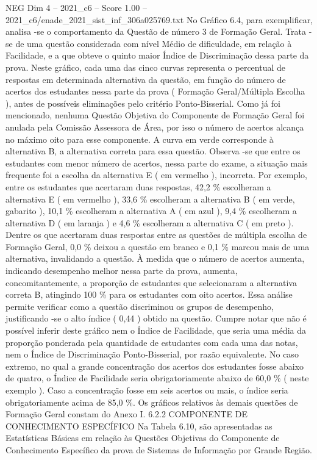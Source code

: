 \begin{textsample}{NEG Dim 4 – 2021\_c6 – Score 1.00 – 2021\_c6/enade\_2021\_sist\_inf\_306a025769.txt}
No Gráfico 6.4, para exemplificar, analisa -se o comportamento da Questão de número 3 de Formação Geral.
Trata -se de uma questão considerada com nível Médio de dificuldade, em relação à Facilidade, e a que obteve o quinto maior Índice de Discriminação dessa parte da prova.
Neste gráfico, cada uma das cinco curvas representa o percentual de respostas em determinada alternativa da questão, em função do número de acertos dos estudantes nessa parte da prova ( Formação Geral/Múltipla Escolha ), antes de possíveis eliminações pelo critério Ponto-Bisserial.
Como já foi mencionado, nenhuma Questão Objetiva do Componente de Formação Geral foi anulada pela Comissão Assessora de Área, por isso o número de acertos alcança no máximo oito para esse componente.
A curva em verde corresponde à alternativa B, a alternativa correta para essa questão.
Observa -se que entre os estudantes com menor número de acertos, nessa parte do exame, a situação mais frequente foi a escolha da alternativa E ( em vermelho ), incorreta.
Por exemplo, entre os estudantes que acertaram duas respostas, 42,2 \% escolheram a alternativa E ( em vermelho ), 33,6 \% escolheram a alternativa B ( em verde, gabarito ), 10,1 \% escolheram a alternativa A ( em azul ), 9,4 \% escolheram a alternativa D ( em laranja ) e 4,6 \% escolheram a alternativa C ( em preto ).
Dentre os que acertaram duas respostas entre as questões de múltipla escolha de Formação Geral, 0,0 \% deixou a questão em branco e 0,1 \% marcou mais de uma alternativa, invalidando a questão.
À medida que o número de acertos aumenta, indicando desempenho melhor nessa parte da prova, aumenta, concomitantemente, a proporção de estudantes que selecionaram a alternativa correta B, atingindo 100 \% para os estudantes com oito acertos.
Essa análise permite verificar como a questão discriminou os grupos de desempenho, justificando -se o alto índice ( 0,44 ) obtido na questão.
Cumpre notar que não é possível inferir deste gráfico nem o Índice de Facilidade, que seria uma média da proporção ponderada pela quantidade de estudantes com cada uma das notas, nem o Índice de Discriminação Ponto-Bisserial, por razão equivalente.
No caso extremo, no qual a grande concentração dos acertos dos estudantes fosse abaixo de quatro, o Índice de Facilidade seria obrigatoriamente abaixo de 60,0 \% ( neste exemplo ).
Caso a concentração fosse em seis acertos ou mais, o índice seria obrigatoriamente acima de 85,0 \%.
Os gráficos relativos às demais questões de Formação Geral constam do Anexo I. 6.2.2 COMPONENTE DE CONHECIMENTO ESPECÍFICO Na Tabela 6.10, são apresentadas as Estatísticas Básicas em relação às Questões Objetivas do Componente de Conhecimento Específico da prova de Sistemas de Informação por Grande Região.

\end{textsample}
